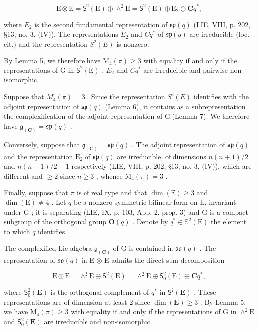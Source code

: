 \[
\mathrm{E} \otimes \mathrm{E} = \mathsf {S} ^ {2} (\mathrm{E}) \oplus \wedge^ {2} \mathrm{E} = \mathsf {S} ^ {2} (\mathrm{E}) \oplus \mathrm{E} _ {2} \oplus \mathbf {C} q ^ {*},
\]

where \(E_{2}\) is the second fundamental representation of \(\mathfrak{sp}(q)\) (LIE, VIII, p. 202, §13, no. 3, (IV)). The representations \(E_{2}\) and \(C q^{*}\) of \(\mathfrak{sp}(q)\) are irreducible (loc. cit.) and the representation \(S^{2}(E)\) is nonzero.

By Lemma 5, we therefore have \(\mathrm{M}_{4}(\pi) \geqslant 3\) with equality if and only if the representations of G in \(\mathsf{S}^{2}(\mathrm{E})\) , \(E_{2}\) and \(Cq^{*}\) are irreducible and pairwise non-isomorphic.

Suppose that \(M_{4}(\pi)=3\) . Since the representation \(S^{2}(E)\) identifies with the adjoint representation of \(\mathfrak{sp}(q)\) (Lemma 6), it contains as a subrepresentation the complexification of the adjoint representation of G (Lemma 7). We therefore have \(\mathfrak{g}_{(\mathbf{C})}=\mathfrak{sp}(q)\) .

Conversely, suppose that \(\mathfrak{g}_{(\mathbf{C})} = \mathfrak{sp}(q)\) . The adjoint representation of \(\mathfrak{sp}(q)\) and the representation \(\mathrm{E}_2\) of \(\mathfrak{sp}(q)\) are irreducible, of dimensions \(n(n + 1)/2\) and \(n(n - 1)/2 - 1\) respectively (LIE, VIII, p. 202, §13, no. 3, (IV)), which are different and \(\geqslant 2\) since \(n \geqslant 3\) , whence \(\mathrm{M}_4(\pi) = 3\) .

Finally, suppose that \(\pi\) is of real type and that \(\dim(\mathrm{E}) \geqslant 3\) and \(\dim(\mathrm{E}) \neq 4\) . Let \(q\) be a nonzero symmetric bilinear form on \(\mathrm{E}\), invariant under G ; it is separating (LIE, IX, p. 103, App. 2, prop. 3) and \(\mathrm{G}\) is a compact subgroup of the orthogonal group \(\mathbf{O}(q)\) . Denote by \(q^{*} \in \mathbb{S}^{2}(\mathrm{E})\) the element to which \(q\) identifies.

The complexified Lie algebra \(\mathfrak{g}_{(\mathbf{C})}\) of G is contained in \(\mathfrak{so}(q)\) . The representation of \(\mathfrak{so}(q)\) in E \(\otimes\) E admits the direct sum decomposition

\[
\mathrm{E} \otimes \mathrm{E} = \wedge^ {2} \mathrm{E} \oplus \mathsf {S} ^ {2} (\mathrm{E}) = \wedge^ {2} \mathrm{E} \oplus \mathsf {S} _ {0} ^ {2} (\mathrm{E}) \oplus \mathbf {C} q ^ {*},
\]

where \(\mathsf{S}_{0}^{2}(\mathbf{E})\) is the orthogonal complement of \(q^{*}\) in \(\mathsf{S}^{2}(\mathbf{E})\) . These representations are of dimension at least 2 since \(\dim(\mathbf{E})\geqslant3\) . By Lemma 5, we have \(\mathrm{M}_{4}(\pi)\geqslant3\) with equality if and only if the representations of G in \(\wedge^{2}\mathrm{E}\) and \(\mathsf{S}_{0}^{2}(\mathbf{E})\) are irreducible and non-isomorphic.

